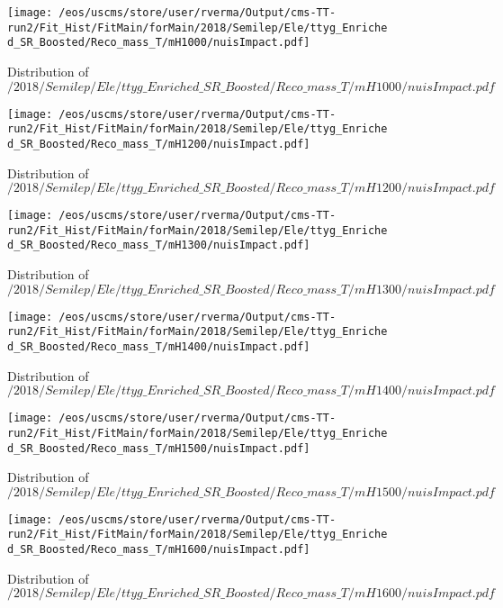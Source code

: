 \begin{figure}
\centering
\texttt{[image: /eos/uscms/store/user/rverma/Output/cms-TT-run2/Fit\_Hist/FitMain/forMain/2018/Semilep/Ele/ttyg\_Enriched\_SR\_Boosted/Reco\_mass\_T/mH1000/nuisImpact.pdf]}
\caption{Distribution of $/2018/Semilep/Ele/ttyg\_Enriched\_SR\_Boosted/Reco\_mass\_T/mH1000/nuisImpact.pdf$}
\end{figure}

\begin{figure}
\centering
\texttt{[image: /eos/uscms/store/user/rverma/Output/cms-TT-run2/Fit\_Hist/FitMain/forMain/2018/Semilep/Ele/ttyg\_Enriched\_SR\_Boosted/Reco\_mass\_T/mH1200/nuisImpact.pdf]}
\caption{Distribution of $/2018/Semilep/Ele/ttyg\_Enriched\_SR\_Boosted/Reco\_mass\_T/mH1200/nuisImpact.pdf$}
\end{figure}

\begin{figure}
\centering
\texttt{[image: /eos/uscms/store/user/rverma/Output/cms-TT-run2/Fit\_Hist/FitMain/forMain/2018/Semilep/Ele/ttyg\_Enriched\_SR\_Boosted/Reco\_mass\_T/mH1300/nuisImpact.pdf]}
\caption{Distribution of $/2018/Semilep/Ele/ttyg\_Enriched\_SR\_Boosted/Reco\_mass\_T/mH1300/nuisImpact.pdf$}
\end{figure}

\begin{figure}
\centering
\texttt{[image: /eos/uscms/store/user/rverma/Output/cms-TT-run2/Fit\_Hist/FitMain/forMain/2018/Semilep/Ele/ttyg\_Enriched\_SR\_Boosted/Reco\_mass\_T/mH1400/nuisImpact.pdf]}
\caption{Distribution of $/2018/Semilep/Ele/ttyg\_Enriched\_SR\_Boosted/Reco\_mass\_T/mH1400/nuisImpact.pdf$}
\end{figure}

\begin{figure}
\centering
\texttt{[image: /eos/uscms/store/user/rverma/Output/cms-TT-run2/Fit\_Hist/FitMain/forMain/2018/Semilep/Ele/ttyg\_Enriched\_SR\_Boosted/Reco\_mass\_T/mH1500/nuisImpact.pdf]}
\caption{Distribution of $/2018/Semilep/Ele/ttyg\_Enriched\_SR\_Boosted/Reco\_mass\_T/mH1500/nuisImpact.pdf$}
\end{figure}

\begin{figure}
\centering
\texttt{[image: /eos/uscms/store/user/rverma/Output/cms-TT-run2/Fit\_Hist/FitMain/forMain/2018/Semilep/Ele/ttyg\_Enriched\_SR\_Boosted/Reco\_mass\_T/mH1600/nuisImpact.pdf]}
\caption{Distribution of $/2018/Semilep/Ele/ttyg\_Enriched\_SR\_Boosted/Reco\_mass\_T/mH1600/nuisImpact.pdf$}
\end{figure}

